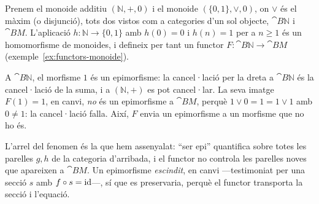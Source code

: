 \begin{exemple}
Prenem el monoide additiu $(\mathbb{N},+,0)$ i el monoide $(\{0,1\},\vee,0)$, on $\vee$ és el màxim (o disjunció), tots dos vistos com a categories d'un sol objecte, $\cat{B}\mathbb{N}$ i $\cat{B}M$. L'aplicació $h\colon\mathbb{N}\to\{0,1\}$ amb $h(0)=0$ i $h(n)=1$ per a $n\geq 1$ és un homomorfisme de monoides, i defineix per tant un functor $F\colon\cat{B}\mathbb{N}\to\cat{B}M$ (exemple~\ref{ex:functors-monoide}).

A $\cat{B}\mathbb{N}$, el morfisme $1$ és un epimorfisme: la cancel·lació per la dreta a $\cat{B}\mathbb{N}$ és la cancel·lació de la suma, i a $(\mathbb{N},+)$ es pot cancel·lar. La seva imatge $F(1)=1$, en canvi, \emph{no} és un epimorfisme a $\cat{B}M$, perquè $1\vee 0=1=1\vee 1$ amb $0\neq 1$: la cancel·lació falla. Així, $F$ envia un epimorfisme a un morfisme que no ho és.

L'arrel del fenomen és la que hem assenyalat: \enquote{ser epi} quantifica sobre totes les parelles $g,h$ de la categoria d'arribada, i el functor no controla les parelles noves que apareixen a $\cat{B}M$. Un epimorfisme \emph{escindit}, en canvi ---testimoniat per una secció $s$ amb $f\circ s=\operatorname{id}$---, sí que es preservaria, perquè el functor transporta la secció i l'equació.
\end{exemple}


